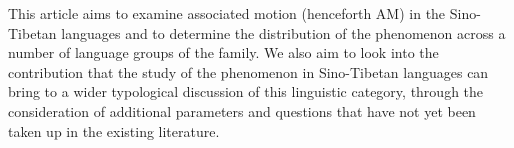 \documentclass[oneside,a4paper,11pt]{article}
\begin{document}
This article aims to examine associated motion (henceforth AM) in the Sino-Tibetan languages and to determine the distribution of the phenomenon across a number of language groups of the family.  We also aim to look into the contribution that the study of the phenomenon in Sino-Tibetan languages can bring to a wider typological discussion of this linguistic category, through the consideration of additional parameters and questions that have not yet been taken up in the existing literature.  
%
%
%
\end{document}
